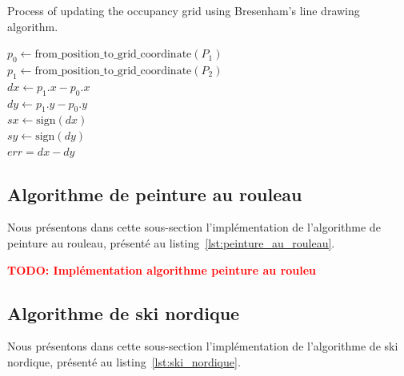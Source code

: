 \documentclass[francais,RandD]{rapportPFE}
\newcommand{\TODO}[1]{\textcolor{red}{\textbf{TODO: #1}}}
\begin{document}
			\begin{algorithm}[h!]
				\caption{Process of updating the occupancy grid using Bresenham's line drawing algorithm.}
				\label{alg:Bresenham}
				$p_0 \gets \text{from\_position\_to\_grid\_coordinate}(P_1)$ \\
				$p_1 \gets \text{from\_position\_to\_grid\_coordinate}(P_2)$ \\
				$dx \gets p_1.x - p_0.x$ \\
				$dy \gets p_1.y - p_0.y$ \\
				$sx \gets \text{sign}(dx)$ \\
				$sy \gets \text{sign}(dy)$ \\
				$err = dx - dy$ \\
			\end{algorithm}
		\subsection*{Algorithme de peinture au rouleau}
			Nous présentons dans cette sous-section l'implémentation de l'algorithme de peinture au rouleau, présenté au listing~\ref{lst:peinture_au_rouleau}.

			\TODO{Implémentation algorithme peinture au rouleu}
		\subsection*{Algorithme de ski nordique}
			Nous présentons dans cette sous-section l'implémentation de l'algorithme de ski nordique, présenté au listing~\ref{lst:ski_nordique}.
\end{document}
